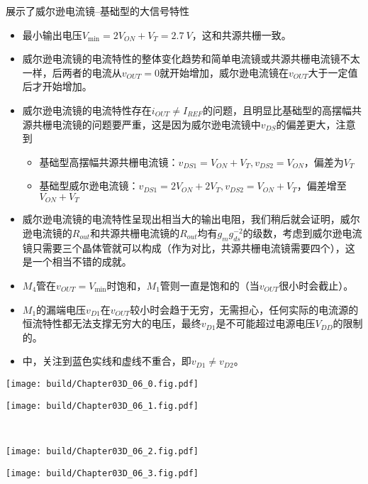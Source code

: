 展示了威尔逊电流镜--基础型的大信号特性
\begin{itemize}
    \item 最小输出电压$V_{\min}=2V_{ON}+V_T=\SI{2.7}{V}$，这和共源共栅一致。
    \item 威尔逊电流镜的电流特性的整体变化趋势和简单电流镜或共源共栅电流镜不太一样，后两者的电流从$v_{OUT}=0$就开始增加，威尔逊电流镜在$v_{OUT}$大于一定值后才开始增加。
    \item 威尔逊电流镜的电流特性存在$i_{OUT}\neq I_{REF}$的问题，且明显比基础型的高摆幅共源共栅电流镜的问题要严重，这是因为威尔逊电流镜中$v_{DS}$的偏差更大，注意到
    \begin{itemize}
        \item 基础型高摆幅共源共栅电流镜：$v_{DS1}=V_{ON}+V_T, v_{DS2}=V_{ON}$，偏差为$V_T$
        \item 基础型威尔逊电流镜：$v_{DS1}=2V_{ON}+2V_T, v_{DS2}=V_{ON}+V_T$，偏差增至$V_{ON}+V_T$ 
    \end{itemize}
    \item 威尔逊电流镜的电流特性呈现出相当大的输出电阻，我们稍后就会证明，威尔逊电流镜的$R_{out}$和共源共栅电流镜的$R_{out}$均有$g_mg_{ds}^{-2}$的级数，考虑到威尔逊电流镜只需要三个晶体管就可以构成（作为对比，共源共栅电流镜需要四个），这是一个相当不错的成就。
    \item $M_4$管在$v_{OUT}=V_{\min}$时饱和，$M_1$管则一直是饱和的（当$v_{OUT}$很小时会截止）。
    \item $M_1$的漏端电压$v_{D1}$在$v_{OUT}$较小时会趋于无穷，无需担心，任何实际的电流源的恒流特性都无法支撑无穷大的电压，最终$v_{D1}$是不可能超过电源电压$V_{DD}$的限制的。
    \item {}中，关注到蓝色实线和虚线不重合，即$v_{D1}\neq v_{D2}$。
\end{itemize}

\begin{Figure}
    \begin{FigureSub}
        \texttt{[image: build/Chapter03D\_06\_0.fig.pdf]}
    \end{FigureSub}
    \begin{FigureSub}
        \texttt{[image: build/Chapter03D\_06\_1.fig.pdf]}
    \end{FigureSub}\\ \vspace{0.25cm}
    \begin{FigureSub}
        \texttt{[image: build/Chapter03D\_06\_2.fig.pdf]}
    \end{FigureSub}
    \begin{FigureSub}
        \texttt{[image: build/Chapter03D\_06\_3.fig.pdf]}
    \end{FigureSub}
\end{Figure}

